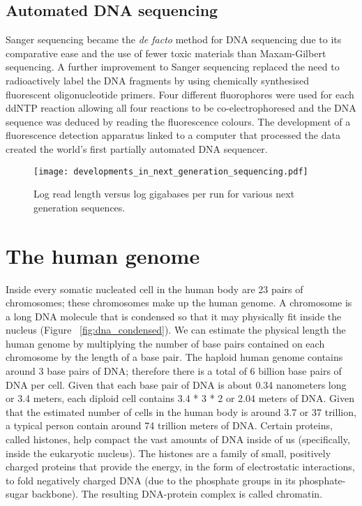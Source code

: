 \subsection{Automated DNA sequencing}

Sanger sequencing became the \textit{de facto} method for DNA sequencing due to its comparative ease and the use of fewer toxic materials than Maxam-Gilbert sequencing. A further improvement to Sanger sequencing replaced the need to radioactively label the DNA fragments by using chemically synthesised fluorescent oligonucleotide primers\cite{pmid3713851}. Four different fluorophores were used for each ddNTP reaction allowing all four reactions to be co-electrophoresed and the DNA sequence was deduced by reading the fluorescence colours. The development of a fluorescence detection apparatus linked to a computer that processed the data created the world's first partially automated DNA sequencer\cite{pmid3713851}.

\begin{figure}[h]
   \centering
   \texttt{[image: developments\_in\_next\_generation\_sequencing.pdf]}
   \caption[Developments in next generation sequencing]{Log read length versus log gigabases per run for various next generation sequences\cite{Nederbragt2012}.}
   \label{fig:dev_next_gen}
\end{figure}

\section{The human genome}

Inside every somatic nucleated cell in the human body are 23 pairs of chromosomes; these chromosomes make up the human genome. A chromosome is a long DNA molecule that is condensed so that it may physically fit inside the nucleus (Figure ~\ref{fig:dna_condensed}). We can estimate the physical length the human genome by multiplying the number of base pairs contained on each chromosome by the length of a base pair. The haploid human genome contains around 3 base pairs of DNA; therefore there is a total of 6 billion base pairs of DNA per cell. Given that each base pair of DNA is about 0.34 nanometers long or 3.4 meters\cite{pmid7354864}, each diploid cell contains 3.4 * 3 * 2 or 2.04 meters of DNA. Given that the estimated number of cells in the human body is around 3.7 or 37 trillion\cite{pmid23829164}, a typical person contain around 74 trillion meters of DNA. Certain proteins, called histones, help compact the vast amounts of DNA inside of us (specifically, inside the eukaryotic nucleus). The histones are a family of small, positively charged proteins that provide the energy, in the form of electrostatic interactions, to fold negatively charged DNA (due to the phosphate groups in its phosphate-sugar backbone). The resulting DNA-protein complex is called chromatin.

